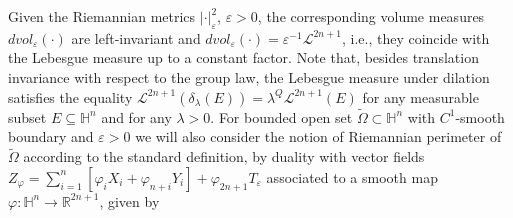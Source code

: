 \documentclass[10pt]{amsart}
\numberwithin{equation}{section}
\newtheorem{remark}[theorem]{Remark}
\theoremstyle{definition}
\newcommand{\R}{{\mathbb R}}
\newcommand{\eps}{\varepsilon}
\newcommand{\He}{\mathbb{H}}
\newcommand{\hpLapMuE}{\mathrm{div}_{\eps}\left( \left( \mu + \|\nabla_{\eps} v\|_{\eps}^{2}\right)^{(p-2)/2}\nabla_{\eps} v \right)}
\begin{document}
 
\medskip
Given the Riemannian metrics $|\cdot|_\varepsilon^2$, $\varepsilon>0$, the corresponding volume measures $ d vol_\varepsilon(\cdot)$ are left-invariant and  $ d vol_\varepsilon(\cdot)= \varepsilon^{-1} \mathcal{L}^{2n+1} $, i.e., they coincide with the Lebesgue measure up to a constant factor.  Note that, besides translation invariance with respect to the group law, the Lebesgue measure under dilation satisfies the equality $  \mathcal{L}^{2n+1} (\delta_\lambda(E))=\lambda^Q \mathcal{L}^{2n+1} (E)$ for any measurable subset $E \subseteq \He^n$ and for any $\lambda>0$. For bounded open set $\widetilde{\Omega} \subset \mathbb{H}^n$ with $C^1$-smooth boundary and $\varepsilon > 0$ we will also consider the notion of Riemannian perimeter of $\widetilde{\Omega}$ according to the standard definition, by duality with vector fields $Z_\varphi=\sum_{i=1}^n \left[ \varphi_i X_i + \varphi_{n+i} Y_i \right]+ \varphi_{2n+1} T_\varepsilon$ associated to a smooth map $\varphi:\He^n \to \mathbb{R}^{2n+1}$, given by 
\end{document}
